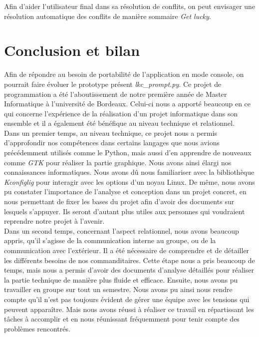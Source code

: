 ﻿\documentclass[17pts]{report}
\begin{document}
Afin d'aider l'utilisateur final dans sa résolution de conflits, on peut
envisager une résolution automatique des conflits de manière sommaire
\textit{Get lucky}.

\chapter{Conclusion et bilan}\thispagestyle{IHA-fancy-style}
\label{cha:Conclusion et bilan}
Afin de répondre au besoin de portabilité de l'application en mode console,
on pourrait faire évoluer le prototype présent \textit{lkc\_prompt.py}.
Ce projet de programmation a été l'aboutissement de notre première année de
Master Informatique à l'université de Bordeaux. Celui-ci nous a apporté
beaucoup en ce qui concerne l'expérience de la réalisation d'un projet
informatique dans son ensemble et il a également été bénéfique au niveau
technique et relationnel.\\

Dans un premier temps, au niveau technique, ce projet nous a permis
d'approfondir nos compétences dans certains langages que nous avions
précédemment utilisés comme le Python, mais aussi d'en apprendre de nouveaux
comme \textit{GTK} pour réaliser la partie graphique. Nous avons ainsi élargi
nos connaissances informatiques. Nous avons dû nous familiariser avec la
bibliothèque \textit{Kconfiglig} pour interagir avec les options d'un noyau
Linux. De même, nous avons pu constater l'importance de l'analyse et conception
dans un projet concret, en nous permettant de fixer les bases du projet afin
d'avoir des documents sur lesquels s'appuyer. Ils seront d'autant plus utiles
aux personnes qui voudraient reprendre notre projet à l'avenir.\\

Dans un second temps, concernant l'aspect relationnel, nous avons beaucoup
appris, qu'il s'agisse de la communication interne au groupe, ou de la
communication avec l'extérieur. Il a été nécessaire de comprendre et de
détailler les différents besoins de nos commanditaires. Cette étape nous a pris
beaucoup de temps, mais nous a permis d'avoir des documents d'analyse détaillés
pour réaliser la partie technique de manière plus fluide et efficace. Ensuite,
nous avons pu travailler en groupe sur tout un semestre. Nous avons pu ainsi
nous rendre compte qu'il n'est pas toujours évident de gérer une équipe avec
les tensions qui peuvent apparaître. Mais nous avons réussi à réaliser ce
travail en répartissant les tâches à accomplir et en nous réunissant
fréquemment pour tenir compte des problèmes rencontrés.\\
\end{document}
